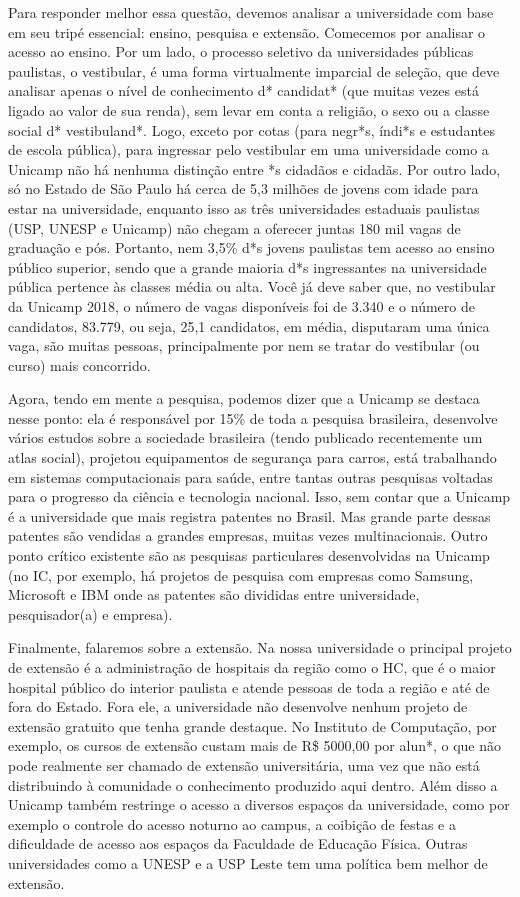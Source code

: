 Para responder melhor essa questão, devemos analisar a universidade com base em
seu tripé essencial: ensino, pesquisa e extensão. Comecemos por analisar o
acesso ao ensino. Por um lado, o processo seletivo da universidades públicas
paulistas, o vestibular, é uma forma virtualmente imparcial de seleção, que
deve analisar apenas o nível de conhecimento d* candidat* (que muitas vezes
está ligado ao valor de sua renda), sem levar em conta a religião, o sexo ou a
classe social d* vestibuland*. Logo, exceto por cotas (para negr*s, índi*s e
estudantes de escola pública), para ingressar pelo vestibular em uma
universidade como a Unicamp não há nenhuma distinção entre *s cidadãos e
cidadãs. Por outro lado, só no Estado de São Paulo há cerca de 5,3 milhões de
jovens com idade para estar na universidade, enquanto isso as três
universidades estaduais paulistas (USP, UNESP e Unicamp) não chegam a oferecer
juntas 180 mil vagas de graduação e pós. Portanto, nem 3,5\% d*s jovens
paulistas tem acesso ao ensino público superior, sendo que a grande maioria d*s
ingressantes na universidade pública pertence às classes média ou alta. Você
já deve saber que, no vestibular da Unicamp 2018, o número de vagas disponíveis
foi de 3.340 e o número de candidatos, 83.779, ou seja, 25,1 candidatos, em
média, disputaram uma única vaga, são muitas pessoas, principalmente por nem se
tratar do vestibular (ou curso) mais concorrido.

Agora, tendo em mente a pesquisa, podemos dizer que a Unicamp se destaca nesse
ponto: ela é responsável por 15\% de toda a pesquisa brasileira, desenvolve
vários estudos sobre a sociedade brasileira (tendo publicado recentemente um
atlas social), projetou equipamentos de segurança para carros, está trabalhando
em sistemas computacionais para saúde, entre tantas outras pesquisas voltadas
para o progresso da ciência e tecnologia nacional. Isso, sem contar que a
Unicamp é a universidade que mais registra patentes no Brasil. Mas grande parte
dessas patentes são vendidas a grandes empresas, muitas vezes multinacionais.
Outro ponto crítico existente são as pesquisas particulares desenvolvidas na
Unicamp (no IC, por exemplo, há projetos de pesquisa com empresas como Samsung,
Microsoft e IBM onde as patentes são divididas entre universidade,
pesquisador(a) e empresa).

Finalmente, falaremos sobre a extensão. Na nossa universidade o principal
projeto de extensão é a administração de hospitais da região como o HC, que é o
maior hospital público do interior paulista e atende pessoas de toda a região e
até de fora do Estado. Fora ele, a universidade não desenvolve nenhum projeto
de extensão gratuito que tenha grande destaque. No Instituto de Computação, por
exemplo, os cursos de extensão custam mais de R\$ 5000,00 por alun*, o que não
pode realmente ser chamado de extensão universitária, uma vez que não está
distribuindo à comunidade o conhecimento produzido aqui dentro.  Além disso a
Unicamp também restringe o acesso a diversos espaços da universidade, como por
exemplo o controle do acesso noturno ao campus, a coibição de festas e a
dificuldade de acesso aos espaços da Faculdade de Educação Física. Outras
universidades como a UNESP e a USP Leste tem uma política bem melhor de
extensão.

